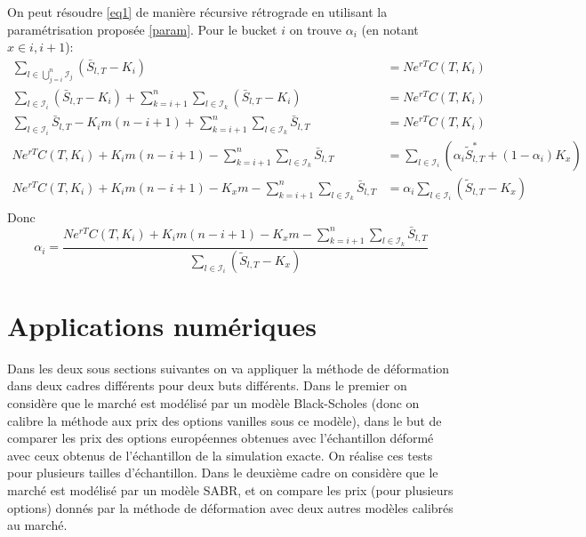 \documentclass[a4paper,12pt]{report}
\numberwithin{equation}{section}
\theoremstyle{definition}
\numberwithin{equation}{section}
\begin{document}
On peut résoudre \ref{eq1} de manière récursive rétrograde en utilisant la paramétrisation proposée \ref{param}. Pour le bucket $i$ on trouve $\alpha_i$ (en notant $x\in{i,i+1}$):
\begin{equation*}
\begin{split}
\sum_{l\in\bigcup_{j=i}^{n}\mathcal{I}_{j}}(\bar{S}_{l,T}-K_{i}) & = Ne^{rT}C(T,K_{i})\\
\sum_{l\in\mathcal{I}_{i}}(\bar{S}_{l,T}-K_{i})+\sum_{k=i+1}^{n}\sum_{l\in\mathcal{I}_{k}}(\bar{S}_{l,T}-K_{i}) & =Ne^{rT}C(T,K_{i})\\
\sum_{l\in\mathcal{I}_{i}}\bar{S}_{l,T}-K_{i}m(n-i+1)+\sum_{k=i+1}^{n}\sum_{l\in\mathcal{I}_{k}}\bar{S}_{l,T} & =Ne^{rT}C(T,K_{i})\\
Ne^{rT}C(T,K_{i})+K_{i}m(n-i+1)-\sum_{k=i+1}^{n}\sum_{l\in\mathcal{I}_{k}}\bar{S}_{l,T} & = \sum_{l\in\mathcal{I}_{i}}\left(\alpha_{i}\tilde{S}_{l,T}^{*}+(1-\alpha_{i})K_{x}\right)\\
 Ne^{rT}C(T,K_{i})+K_{i}m(n-i+1)-K_{x}m-\sum_{k=i+1}^{n}\sum_{l\in\mathcal{I}_{k}}\bar{S}_{l,T} & =\alpha_{i}\sum_{l\in\mathcal{I}_{i}}\left(\tilde{S}_{l,T}^{}-K_{x}\right)    \\
\end{split}
\end{equation*}
Donc 
$$\alpha_{i} =  \frac{Ne^{rT}C(T,K_{i})+K_{i}m(n-i+1)-K_{x}m-\displaystyle \sum_{k=i+1}^{n}\sum_{l\in\mathcal{I}_{k}}\bar{S}_{l,T}}{\displaystyle \sum_{l\in\mathcal{I}_{i}}\left(\tilde{S}_{l,T}^{}-K_{x}\right)}$$

\section{Applications numériques}
Dans les deux sous sections suivantes on va appliquer la méthode de déformation dans deux cadres différents pour deux buts différents. Dans le premier on considère que le marché est modélisé par un modèle Black-Scholes (donc on calibre la méthode aux prix des options vanilles sous ce modèle), dans le but de comparer les prix des options européennes obtenues avec l'échantillon déformé avec ceux obtenus de l'échantillon de la simulation exacte. On réalise ces tests pour plusieurs tailles d'échantillon. Dans le deuxième cadre on considère que le marché est modélisé par un modèle SABR, et on compare les prix (pour plusieurs options) donnés par la méthode de déformation avec deux autres modèles calibrés au marché.
\end{document}
